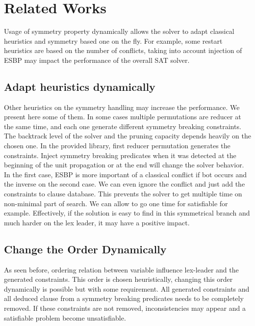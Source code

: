 \section{Related Works}
Usage of symmetry property dynamically allows the solver to adapt classical heuristics and symmetry based one on the fly.
For example, some restart heuristics are based on the number of conflicts, taking into account injection of ESBP may impact
the performance of the overall SAT solver. 
\subsection{Adapt heuristics dynamically}
Other heuristics on the symmetry handling may increase the performance. We present here some of them.
In some cases multiple permutations are reducer at the same time, and each one generate different symmetry breaking constraints.
The backtrack level of the solver and the pruning capacity depends heavily on the chosen one. In the provided library, first reducer permutation generates the constraints. Inject symmetry breaking predicates when it was detected at the beginning of the 
unit propagation or at the end will change the solver behavior. In the first case, ESBP is more important of a classical conflict
if bot occurs and the inverse on the second case. We can even ignore the conflict and just add the constraints to clause database.
This prevents the solver to get multiple time on non-minimal part of search. We can allow to go one time for satisfiable  
for example. Effectively, if the solution is easy to find in this symmetrical branch and much harder on the lex leader, it may
have a positive impact.
\subsection{Change the Order Dynamically}
As seen before, ordering relation between variable influence lex-leader and the generated constraints. This order is chosen 
heuristically, changing this order dynamically is possible but with some requirement. All generated constraints and all deduced 
clause from a symmetry breaking predicates needs to be completely removed. If these constraints are not removed, inconsistencies 
may appear and a satisfiable problem become unsatisfiable.




